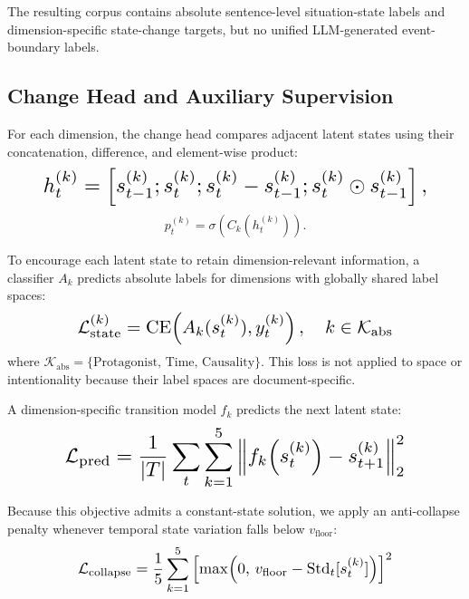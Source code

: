 \documentclass[11pt]{article}
\begin{document}
The resulting corpus contains absolute sentence-level situation-state labels and dimension-specific state-change targets, but no unified LLM-generated event-boundary labels.

\subsection{Change Head and Auxiliary Supervision}
\label{app:supervision-details}

For each dimension, the change head compares adjacent latent states using their concatenation, difference, and element-wise product:
\begin{equation}
\resizebox{0.88\linewidth}{!}{$
h_t^{(k)} = \left[ s_{t-1}^{(k)}; s_t^{(k)}; s_t^{(k)}-s_{t-1}^{(k)}; s_t^{(k)}\odot s_{t-1}^{(k)} \right],
$}
\end{equation}
\begin{equation}
p_t^{(k)} = \sigma\left(C_k\left(h_t^{(k)}\right)\right).
\end{equation}

To encourage each latent state to retain dimension-relevant information, a classifier $A_k$ predicts absolute labels for dimensions with globally shared label spaces:
\begin{equation}
\resizebox{0.72\columnwidth}{!}{$\displaystyle
\mathcal{L}_{\mathrm{state}}^{(k)}
=
\operatorname{CE}\!\left(
A_k(s_t^{(k)}), y_t^{(k)}
\right),
\quad k\in\mathcal{K}_{\mathrm{abs}}
$}
\end{equation}
where $\mathcal{K}_{\mathrm{abs}}=\{\text{Protagonist, Time, Causality}\}$. This loss is not applied to space or intentionality because their label spaces are document-specific.

A dimension-specific transition model $f_k$ predicts the next latent state:
\begin{equation}
\resizebox{0.78\columnwidth}{!}{$\displaystyle
\mathcal{L}_{\mathrm{pred}}
=
\frac{1}{|T|}
\sum_t \sum_{k=1}^{5}
\left\|
f_k\!\left(s_t^{(k)}\right)-s_{t+1}^{(k)}
\right\|_2^2
$}
\end{equation}

Because this objective admits a constant-state solution, we apply an anti-collapse penalty whenever temporal state variation falls below $v_{\mathrm{floor}}$:
\begin{equation}
\resizebox{0.72\columnwidth}{!}{$\displaystyle
\mathcal{L}_{\mathrm{collapse}}
=
\frac{1}{5}
\sum_{k=1}^{5}
\left[
\max\!\left(
0,\,
v_{\mathrm{floor}}
-
\operatorname{Std}_t[s_t^{(k)}]
\right)
\right]^2
$}
\end{equation}
\end{document}
